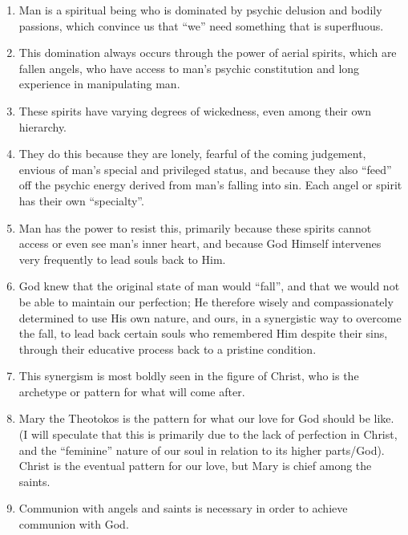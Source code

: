 \begin{enumerate}

\item Man is a spiritual being who is dominated by psychic delusion and bodily passions, which convince us that “we” need something that is superfluous.

\item This domination always occurs through the power of aerial spirits, which are fallen angels, who have access to man's psychic constitution and long experience in manipulating man.

\item These spirits have varying degrees of wickedness, even among their own hierarchy.

\item They do this because they are lonely, fearful of the coming judgement, envious of man's special and privileged status, and because they also “feed” off the psychic energy derived from man's falling into sin. Each angel or spirit has their own “specialty”.

\item Man has the power to resist this, primarily because these spirits cannot access or even see man's inner heart, and because God Himself intervenes very frequently to lead souls back to Him.

\item God knew that the original state of man would “fall”, and that we would not be able to maintain our perfection; He therefore wisely and compassionately determined to use His own nature, and ours, in a synergistic way to overcome the fall, to lead back certain souls who remembered Him despite their sins, through their educative process back to a pristine condition.

\item This synergism is most boldly seen in the figure of Christ, who is the archetype or pattern for what will come after.

\item Mary the Theotokos is the pattern for what our love for God should be like. (I will speculate that this is primarily due to the lack of perfection in Christ, and the “feminine” nature of our soul in relation to its higher parts/God). Christ is the eventual pattern for our love, but Mary is chief among the saints.

\item Communion with angels and saints is necessary in order to achieve communion with God.


\end{enumerate}
